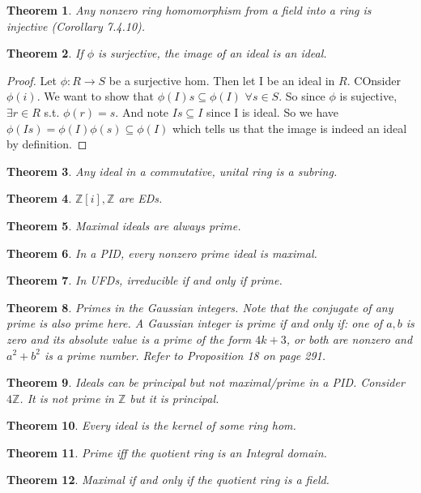 \documentclass[10pt,oneside,reqno]{amsart}
\theoremstyle{plain}
\newtheorem{theorem}{Theorem}
\theoremstyle{definition}
\newcommand{\sub}{\subseteq}
\newcommand{\fa}{\forall}
\newcommand{\z}{\mathbb{Z}}
\begin{document}
\begin{theorem}
Any nonzero ring homomorphism from a field into a ring is injective (Corollary 7.4.10). 
\end{theorem}

\begin{theorem}
If $\phi$ is surjective, the image of an ideal is an ideal. 
\end{theorem}
\begin{proof}
Let $\phi:R \to S$ be a surjective hom. Then let I be an ideal in $R$. COnsider $\phi(i)$. We want to show that $\phi(I)s \sub \phi(I)$ $\fa s \in S$. So since $\phi$ is sujective, $\exists r \in R$ s.t. $\phi(r) = s$. And note $Is \sub I$ since I is ideal. So we have $\phi(Is) = \phi(I)\phi(s) \sub \phi(I)$ which tells us that the image is indeed an ideal by definition. 
\end{proof}

\begin{theorem}
Any ideal in a commutative, unital ring is a subring. 
\end{theorem}

\begin{theorem}
$\z[i],\z$ are EDs. 
\end{theorem}

\begin{theorem}
Maximal ideals are always prime. 
\end{theorem}

\begin{theorem}
In a PID, every nonzero prime ideal is maximal. 
\end{theorem}

\begin{theorem}
In UFDs, irreducible if and only if prime. 
\end{theorem}

\begin{theorem}
Primes in the Gaussian integers. Note that the conjugate of any prime is also prime here. A Gaussian integer is prime if and only if: one of $a,b$ is zero and its absolute value is a prime of the form $4k + 3$, or both are nonzero and $a^2 + b^2$ is a prime number. Refer to Proposition 18 on page 291. 
\end{theorem}

\begin{theorem}
Ideals can be principal but not maximal/prime in a PID. Consider $4\z$. It is not prime in $\z$ but it is principal. 
\end{theorem}

\begin{theorem}
Every ideal is the kernel of some ring hom. 
\end{theorem}

\begin{theorem}
Prime iff the quotient ring is an Integral domain. 
\end{theorem}

\begin{theorem}
Maximal if and only if the quotient ring is a field. 
\end{theorem}
\end{document}
